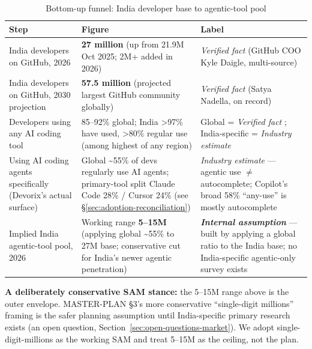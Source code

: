 \begin{table}[htbp]
\centering
\caption{Bottom-up funnel: India developer base to agentic-tool pool}
\label{tab:bottom-up-funnel}
\small
\begin{tabular}{p{4.3cm}p{5.0cm}p{3.2cm}}
\toprule
\textbf{Step} & \textbf{Figure} & \textbf{Label} \\
\midrule
India developers on GitHub, 2026 & \textbf{27 million} (up from 21.9M Oct 2025; 2M+ added in 2026) & \textit{Verified fact} (GitHub COO Kyle Daigle, multi-source) \cite{github_2026} \\
India developers on GitHub, 2030 projection & \textbf{57.5 million} (projected largest GitHub community globally) & \textit{Verified fact} (Satya Nadella, on record) \cite{nadella_2026} \\
Developers using any AI coding tool & 85--92\% global; India \textgreater 97\% have used, \textgreater 80\% regular use (among highest of any region) & Global = \textit{Verified fact} \cite{masterplan_2026}; India-specific = \textit{Industry estimate} \\
Using AI coding agents specifically (Devorix's actual surface) & Global \textasciitilde 55\% of devs regularly use AI agents; primary-tool split Claude Code 28\% / Cursor 24\% (see \S\ref{sec:adoption-reconciliation}) & \textit{Industry estimate} --- agentic use \(\neq\) autocomplete; Copilot's broad 58\% ``any-use'' is mostly autocomplete \cite{agentictoolsurvey_2026} \\
Implied India agentic-tool pool, 2026 & Working range \textbf{5--15M} (applying global \textasciitilde 55\% to 27M base; conservative cut for India's newer agentic penetration) & \textbf{\textit{Internal assumption}} --- built by applying a global ratio to the India base; no India-specific agentic-only survey exists \\
\bottomrule
\end{tabular}
\end{table}

\textbf{A deliberately conservative SAM stance:} the 5--15M range above is the outer envelope. MASTER-PLAN \S 3's more conservative ``single-digit millions'' framing is the safer planning assumption until India-specific primary research exists (an open question, Section~\ref{sec:open-questions-market}). We adopt single-digit-millions as the working SAM and treat 5--15M as the ceiling, not the plan.

